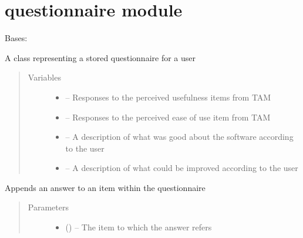 \documentclass[letterpaper,10pt,english]{sphinxmanual}
\begin{document}
\chapter{questionnaire module}
\label{\detokenize{questionnaire:questionnaire-module}}\label{\detokenize{questionnaire:module-questionnaire}}\label{\detokenize{questionnaire::doc}}

\begin{fulllineitems}
\label{\detokenize{questionnaire:questionnaire.Questionnaire}}
Bases: 

A class representing a stored questionnaire for a user
\begin{quote}\begin{description}
\item[{Variables}] \leavevmode\begin{itemize}
\item {} 
 -- Responses to the perceived usefulness items from TAM

\item {} 
 -- Responses to the perceived ease of use item from TAM

\item {} 
 -- A description of what was good about the software according to the user

\item {} 
 -- A description of what could be improved according to the user

\end{itemize}

\end{description}\end{quote}

\begin{fulllineitems}
\label{\detokenize{questionnaire:questionnaire.Questionnaire.append_answer}}
Appends an answer to an item within the questionnaire
\begin{quote}\begin{description}
\item[{Parameters}] \leavevmode\begin{itemize}
\item {} 
 ({\hyperref[\detokenize{questionnaire_item:questionnaire_item.QuestionnaireItem}]{}}) -- The item to which the answer refers


\end{itemize}
\end{description}
\end{quote}
\end{fulllineitems}
\end{fulllineitems}
\end{document}
